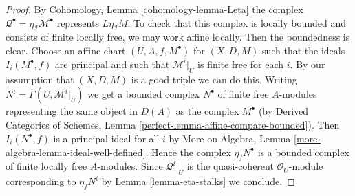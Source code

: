 \documentclass[10pt,a4paper]{amsart}
\theoremstyle{plain}
\theoremstyle{definition}
\theoremstyle{remark}
\numberwithin{equation}{subsection}
\begin{document}
\begin{proof}
By Cohomology, Lemma \ref{cohomology-lemma-Leta}
the complex $\mathcal{Q}^\bullet = \eta_\mathcal{I}\mathcal{M}^\bullet$
represents $L\eta_\mathcal{I}M$. To check that this complex
is locally bounded and consists of finite locally free, we may work
affine locally. Then the boundedness is clear.
Choose an affine chart $(U, A, f, M^\bullet)$ for $(X, D, M)$
such that the ideals $I_i(M^\bullet, f)$ are principal and such that
$\mathcal{M}^i|_U$ is finite free for each $i$. By our assumption
that $(X, D, M)$ is a good triple we can do this. Writing
$N^i = \Gamma(U, \mathcal{M}^i|_U)$ we get a bounded
complex $N^\bullet$ of finite free $A$-modules representing the
same object in $D(A)$ as the complex $M^\bullet$ (by
Derived Categories of Schemes, Lemma
\ref{perfect-lemma-affine-compare-bounded}).
Then $I_i(N^\bullet, f)$ is a principal ideal for all $i$
by More on Algebra, Lemma \ref{more-algebra-lemma-ideal-well-defined}.
Hence the complex $\eta_fN^\bullet$ is a bounded complex
of finite locally free $A$-modules. Since
$\mathcal{Q}^i|_U$ is the quasi-coherent $\mathcal{O}_U$-module
corresponding to $\eta_fN^i$ by Lemma \ref{lemma-eta-stalks} we conclude.
\end{proof}
\end{document}
